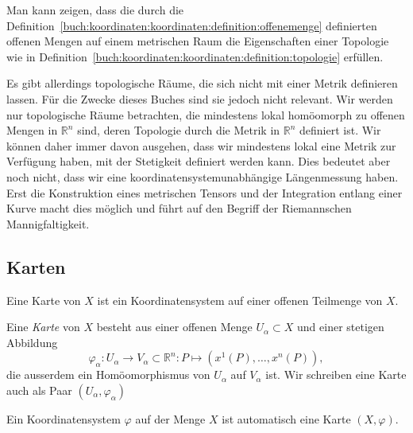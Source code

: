 Man kann zeigen, dass die durch die 
Definition~\ref{buch:koordinaten:koordinaten:definition:offenemenge}
definierten offenen Mengen auf einem metrischen Raum
die Eigenschaften einer Topologie wie in
Definition~\ref{buch:koordinaten:koordinaten:definition:topologie}
erfüllen.

Es gibt allerdings topologische Räume, die sich nicht mit einer
Metrik definieren lassen.
Für die Zwecke dieses Buches sind sie jedoch nicht relevant.
Wir werden nur topologische Räume betrachten, die mindestens
lokal homöomorph zu offenen Mengen in $\mathbb{R}^n$ sind, deren
Topologie durch die Metrik in $\mathbb{R}^n$ definiert ist.
Wir können daher immer davon ausgehen, dass wir mindestens lokal
eine Metrik zur Verfügung haben, mit der Stetigkeit definiert
werden kann.
Dies bedeutet aber noch nicht, dass wir eine koordinatensystemunabhängige
Längenmessung haben.
Erst die Konstruktion eines metrischen Tensors und der Integration entlang
einer Kurve macht dies möglich und führt auf den Begriff der Riemannschen
Mannigfaltigkeit.
%
%


%
%
\subsection{Karten}
Eine Karte von $X$ ist ein Koordinatensystem auf einer offenen Teilmenge
von $X$.

\begin{definition}[Karte]
Eine {\em Karte} von $X$ besteht aus einer offenen Menge $U_\alpha\subset X$
und einer stetigen Abbildung
\[
\varphi_\alpha
\colon
U_\alpha\to V_\alpha\subset\mathbb{R}^n
:
P
\mapsto
(x^1(P),\dots,x^n(P)),
\]
die ausserdem ein Homöomorphismus von $U_\alpha$ auf $V_\alpha$ ist.
Wir schreiben eine Karte auch als Paar $(U_\alpha,\varphi_\alpha)$
%
\end{definition}

Ein Koordinatensystem $\varphi$ auf der Menge $X$ ist automatisch eine
Karte $(X,\varphi)$.

%
%
